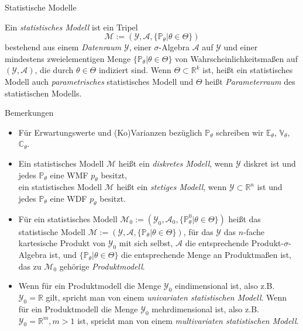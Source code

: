 \documentclass[
  8pt,
  ignorenonframetext,
]{beamer}
\providecommand{\tightlist}{%
  \setlength{\itemsep}{0pt}\setlength{\parskip}{0pt}}
\begin{document}
\begin{frame}{Statistische Modelle}
\protect\hypertarget{statistische-modelle}{}
\footnotesize
\begin{definition}
\justifying
Ein \textit{statistisches Modell} ist ein Tripel
\begin{equation}
\mathcal{M} := (\mathcal{Y}, \mathcal{A}, \{\mathbb{P}_\theta |\theta \in \Theta\})
\end{equation}
bestehend  aus einem \textit{Datenraum} $\mathcal{Y}$, einer $\sigma$-Algebra
$\mathcal{A}$ auf $\mathcal{Y}$ und einer mindestens zweielementigen Menge
$\{\mathbb{P}_\theta |\theta \in \Theta\}$ von Wahrscheinlichkeitsmaßen auf
$(\mathcal{Y}, \mathcal{A})$, die durch $\theta \in \Theta$ indiziert sind.
Wenn $\Theta \subset \mathbb{R}^k$ ist, heißt ein statistisches Modell auch \textit{parametrisches} 
statistisches Modell und $\Theta$ heißt \textit{Parameterraum} des statistischen Modells.
\end{definition}

\footnotesize

Bemerkungen

\begin{itemize}
\tightlist
\item
  Für Erwartungswerte und (Ko)Varianzen bezüglich \(\mathbb{P}_\theta\)
  schreiben wir \(\mathbb{E}_\theta\), \(\mathbb{V}_\theta\),
  \(\mathbb{C}_\theta\).
\item
  \justifying Ein statistisches Modell \(\mathcal{M}\) heißt ein
  \emph{diskretes Modell}, wenn \(\mathcal{Y}\) diskret ist und jedes
  \(\mathbb{P}_\theta\) eine WMF \(p_\theta\) besitzt,\\
  ein statistisches Modell \(\mathcal{M}\) heißt ein \emph{stetiges
  Modell}, wenn \(\mathcal{Y} \subset \mathbb{R}^n\) ist und jedes
  \(\mathbb{P}_\theta\) eine WDF \(p_\theta\) besitzt.
\item
  Für ein statistisches Modell
  \(\mathcal{M}_0 := (\mathcal{Y}_0, \mathcal{A}_0, \{\mathbb{P}_\theta^0 |\theta \in \Theta\})\)
  heißt das statistische Modell
  \(\mathcal{M} := (\mathcal{Y}, \mathcal{A}, \{\mathbb{P}_\theta |\theta \in \Theta\})\),
  für das \(\mathcal{Y}\) das \(n\)-fache kartesische Produkt von
  \(\mathcal{Y}_0\) mit sich selbst, \(\mathcal{A}\) die entsprechende
  Produkt-\(\sigma\)-Algebra ist, und
  \(\{\mathbb{P}_\theta |\theta \in \Theta\}\) die entsprechende Menge
  an Produktmaßen ist, das zu \(\mathcal{M}_0\) gehörige
  \emph{Produktmodell}.
\item
  Wenn für ein Produktmodell die Menge \(\mathcal{Y}_0\) eindimensional
  ist, also z.B. \(\mathcal{Y}_0 = \mathbb{R}\) gilt, spricht man von
  einem \emph{univariaten statistischen Modell}. Wenn für ein
  Produktmodell die Menge \(\mathcal{Y}_0\) mehrdimensional ist, also
  z.B. \(\mathcal{Y}_0 = \mathbb{R}^m, m > 1\) ist, spricht man von
  einem \emph{multivariaten statistischen Modell}.
\end{itemize}
\end{frame}
\end{document}
